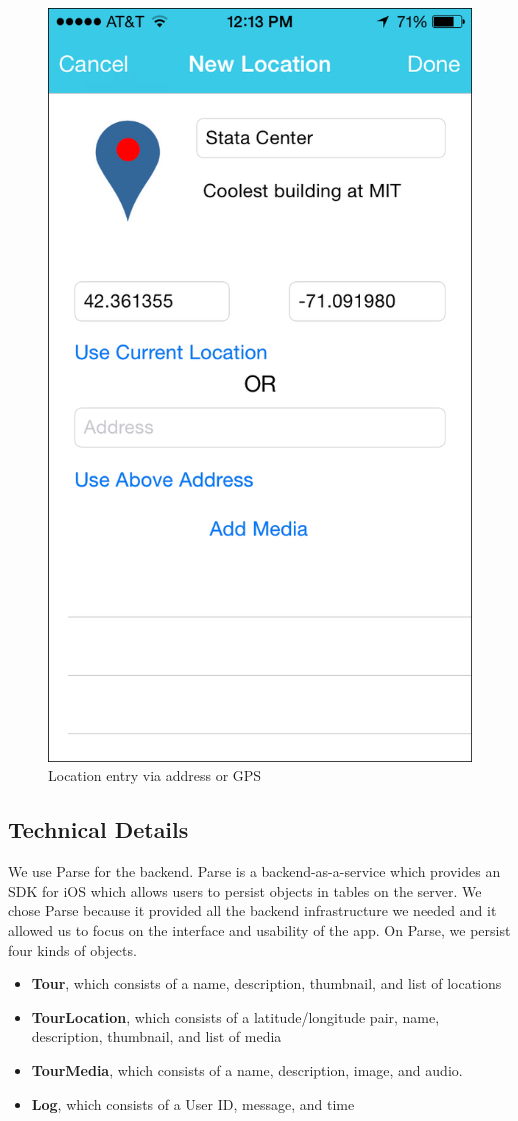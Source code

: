 \documentclass{sigchi}
\begin{document}
\begin{figure}
\centering
\includegraphics[width=0.7\linewidth]{./EnterLocation}
\caption{Location entry via address or GPS} 
\label{fig:EnterLocation}
\end{figure}

\subsection{Technical Details}
We use Parse for the backend. Parse is a backend-as-a-service which provides an SDK for iOS which allows users to persist objects in tables on the server. We chose Parse because it provided all the backend infrastructure we needed and it allowed us to focus on the interface and usability of the app. On Parse, we persist four kinds of objects. 

\begin{itemize}
\item \textbf{Tour}, which consists of a name, description, thumbnail, and list of locations
\item \textbf{TourLocation}, which consists of a latitude/longitude pair, name, description, thumbnail, and list of media
\item \textbf{TourMedia}, which consists of a name, description, image, and audio. 
\item \textbf{Log}, which consists of a User ID, message, and time
\end{itemize}
\end{document}
